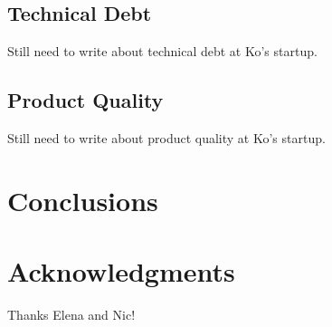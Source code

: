 \documentclass{sig-alternate}
\begin{document}
\subsection{Technical Debt}
Still need to write about technical debt at Ko's startup.

\subsection{Product Quality}
Still need to write about product quality at Ko's startup.

\section{Conclusions}
\label{sec:conclusions}

\section*{Acknowledgments}
\label{sec:acknowledgments}

Thanks Elena and Nic!


  
\end{document}
